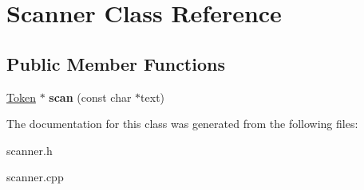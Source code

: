 \hypertarget{classScanner}{\section{Scanner Class Reference}
\label{classScanner}
}
\subsection*{Public Member Functions}
\begin{DoxyCompactItemize}
\item 
\hypertarget{classScanner_a40f021dac0075b146272e42d425b2ba5}{\hyperlink{classToken}{Token} $\ast$ {\bfseries scan} (const char $\ast$text)}\label{classScanner_a40f021dac0075b146272e42d425b2ba5}

\end{DoxyCompactItemize}


The documentation for this class was generated from the following files\-:\begin{DoxyCompactItemize}
\item 
scanner.\-h\item 
scanner.\-cpp\end{DoxyCompactItemize}
